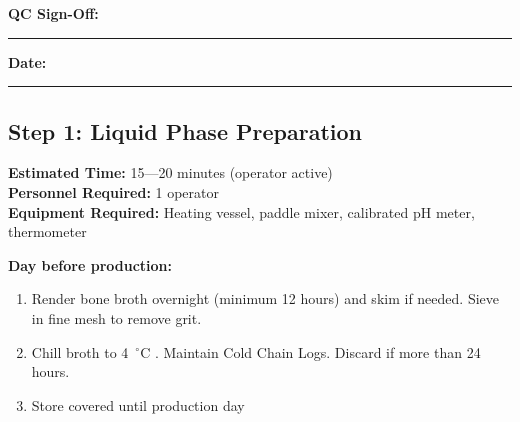 \vspace{1em}
\noindent\textbf{QC Sign-Off:} \rule{5cm}{0.4pt} \hspace{1cm} \textbf{Date:} \rule{3cm}{0.4pt}


\subsection*{Step 1: Liquid Phase Preparation}

\textbf{Estimated Time:} 15---20 minutes (operator active) \\
\textbf{Personnel Required:} 1 operator \\
\textbf{Equipment Required:} Heating vessel, paddle mixer, calibrated pH meter, thermometer

\vspace{0.5em}
\textbf{Day before production:}
\begin{enumerate}[leftmargin=1.5em]
\item Render bone broth overnight (minimum 12 hours) and skim if needed.
Sieve in fine mesh to remove grit. 
\item Chill broth to 4~$^\circ$C . Maintain Cold Chain Logs.
Discard if more than 24 hours. 
\item Store covered until production day
\end{enumerate}

